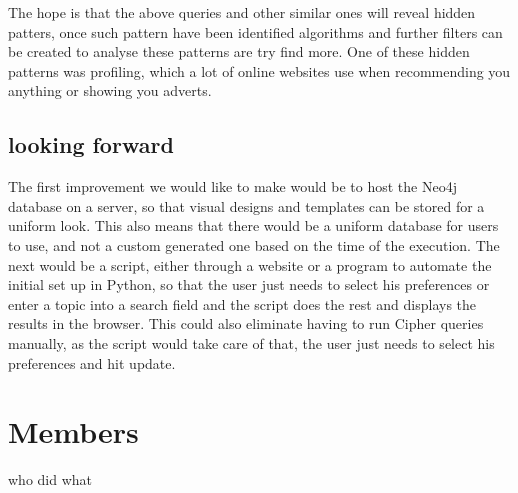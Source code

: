 \documentclass[11pt]{article}
\begin{document}
The hope is that the above queries and other similar ones will reveal hidden patters, once such pattern have been identified algorithms and further filters can be created to analyse these patterns are try find more. One of these hidden patterns was profiling, which a lot of online websites use when recommending you anything or showing you adverts. 

\subsection{looking forward}
The first improvement we would like to make would be to host the Neo4j database on a server, so that visual designs and templates can be stored for a uniform look. This also means that there would be a uniform database for users to use, and not a custom generated one based on the time of the execution. The next would be a script, either through a website or a program to automate the initial set up in Python, so that the user just needs to select his preferences or enter a topic into a search field and the script does the rest and displays the results in the browser. This could also eliminate having to run Cipher queries manually, as the script would take care of that, the user just needs to select his preferences and hit update.

\section{Members}
who did what
\end{document}
